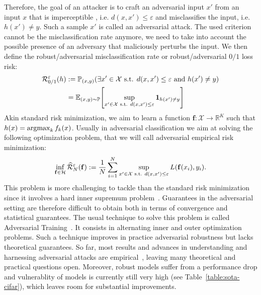 Therefore, the goal of an attacker is to craft an adversarial input $x'$ from an input $x$ that is imperceptible , i.e. $d(x,x')\leq \varepsilon$ and misclassifies the input, i.e. $h(x')\neq y$. Such a sample $x'$ is called an adversarial attack. The used criterion cannot be the misclassification rate anymore, we need to take into account the possible presence of an adversary that maliciously perturbs the input. We then define the robust/adversarial misclassification rate or robust/adversarial $0/1$ loss risk: 
\begin{align*}
\risk_{0/1}^{\varepsilon}(h)&:=\PP_{(x,y)}(\exists x'\in\XX\text{ s.t. } d(x,x')\leq \varepsilon \text{ and } h(x')\neq y)\\
&= \EE_{(x,y)\sim\PP}\left[\sup_{x'\in\XX\text{ s.t. } d(x,x')\leq \varepsilon}\mathbf{1}_{h(x')\neq y}\right]
\end{align*}
Akin standard risk minimization, we aim to learn a function $\mathbf{f}:\mathcal{X}\to\mathbb{R}^K$ such that $h(x)=\operatorname*{argmax}_k f_k(x)$. Usually in adversarial classification we aim at solving the following optimization problem, that we will call adversarial empirical risk minimization:
\begin{align*}
\inf_{\mathbf{f}\in\mathcal{H}}\widehat{\mathcal{R}}^\varepsilon_{N}(\mathbf{f}):= \frac{1}{N}\sum_{i=1}^N\sup_{x'\in\mathcal{X}\text{ s.t. } d(x,x')\leq \varepsilon} L(\mathbf{f}(x_i),y_i).
\end{align*}
This problem is more challenging to tackle than the standard risk minimization  since it involves a hard inner supremum problem~\citep{madry2018towards}. Guarantees in the adversarial setting are therefore difficult to obtain both in terms of convergence and statistical guarantees. The usual technique to solve this problem is called Adversarial Training~\citep{goodfellow2014explaining,madry2018towards}. It consists in alternating inner and outer optimization problems. Such a technique improves in practice adversarial robustness but lacks theoretical guarantees. So far, most results and advances in understanding and harnessing adversarial attacks are empirical~\citep{ilyas2019adversarial,rice2020overfitting}, leaving many theoretical and practical questions open.  Moreover, robust models suffer from a performance drop and vulnerablity of models is currently still very high (see Table~\ref{table:sota-cifar}), which leaves room for substantial improvements.

